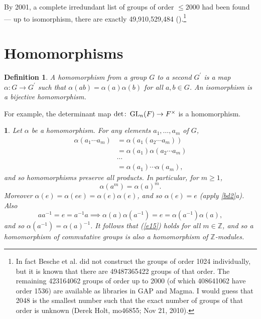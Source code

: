 \documentclass[a4paper,11pt,final,openany]{memoir}%
\newtheorem{definition}[X]{Definition}
\newtheorem{plain}[X]{}
\theoremstyle{nonumberplain}
\begin{document}
By 2001, a complete irredundant list of groups of order $\leq2000$ had been
found --- up to isomorphism, there are exactly 49,910,529,484
(\cite{besche2001}).\footnote{In fact Besche et al. did not construct the
groups of order 1024 individually, but it is known that there are 49487365422
groups of that order. The remaining 423164062 groups of order up to 2000 (of
which 408641062 have order 1536) are available as libraries in GAP and Magma.
I would guess that 2048 is the smallest number such that the exact number of
groups of that order is unknown (Derek Holt, mo46855; Nov 21, 2010).}

\section{Homomorphisms}

\begin{definition}
\label{bd9}A \emph{homomorphism}%
%
\emph{\/} from a group $G$ to a second $G^{\prime}$ is a map $\alpha\colon
G\rightarrow G^{\prime}$ such that $\alpha(ab)=\alpha(a)\alpha(b)$ for all
$a,b\in G$. An \emph{isomorphism}%
is a bijective homomorphism.
\end{definition}

For example, the determinant map $\det\colon\operatorname{GL}_{n}(F)\rightarrow F^{\times}$
is a homomorphism.

\begin{plain}
\label{bd10}Let $\alpha$ be a homomorphism. For any elements $a_{1}%
,\ldots,a_{m}$ of $G$,%
\begin{align*}
\alpha(a_{1}\cdots a_{m})  &  =\alpha(a_{1}(a_{2}\cdots a_{m}))\\
&  =\alpha(a_{1})\alpha(a_{2}\cdots a_{m})\\
&  \cdots\\
&  =\alpha(a_{1})\cdots\alpha(a_{m})\text{,}%
\end{align*}
and so homomorphisms preserve all products. In particular, for $m\geq1$,
\begin{equation}
\alpha(a^{m})=\alpha(a)^{m}. \label{e15}%
\end{equation}
Moreover $\alpha(e)=\alpha(ee)=\alpha(e)\alpha(e)$, and so $\alpha(e)=e$
(apply \ref{bd2}a). Also
\[
aa^{-1}=e=a^{-1}a\implies\alpha(a)\alpha(a^{-1})=e=\alpha(a^{-1})\alpha(a),
\]
and so $\alpha(a^{-1})=\alpha(a)^{-1}$. It follows that (\ref{e15}) holds for
all $m\in\mathbb{Z}$, and so a homomorphism of commutative groups is also a
homomorphism of $\mathbb{Z}$-modules.
\end{plain}
\end{document}
